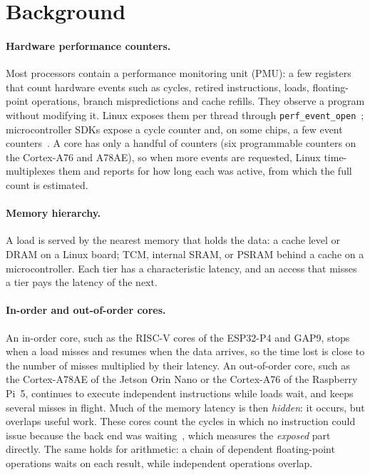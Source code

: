 \documentclass[10pt,a4paper,twocolumn]{article}
\newcommand{\code}[1]{\texttt{\small #1}}
\begin{document}
\section{Background}

\paragraph{Hardware performance counters.} Most processors contain a performance monitoring unit (PMU): a few registers that count hardware events such as cycles, retired instructions, loads, floating-point operations, branch mispredictions and cache refills. They observe a program without modifying it. Linux exposes them per thread through \code{perf\_event\_open}~\cite{perfman}; microcontroller SDKs expose a cycle counter and, on some chips, a few event counters~\cite{espidf,gapsdk}. A core has only a handful of counters (six programmable counters on the Cortex-A76 and A78AE), so when more events are requested, Linux time-multiplexes them and reports for how long each was active, from which the full count is estimated.

\paragraph{Memory hierarchy.} A load is served by the nearest memory that holds the data: a cache level or DRAM on a Linux board; TCM, internal SRAM, or PSRAM behind a cache on a microcontroller. Each tier has a characteristic latency, and an access that misses a tier pays the latency of the next.

\paragraph{In-order and out-of-order cores.} An in-order core, such as the RISC-V cores of the ESP32-P4 and GAP9, stops when a load misses and resumes when the data arrives, so the time lost is close to the number of misses multiplied by their latency. An out-of-order core, such as the Cortex-A78AE of the Jetson Orin Nano or the Cortex-A76 of the Raspberry Pi~5, continues to execute independent instructions while loads wait, and keeps several misses in flight. Much of the memory latency is then \emph{hidden}: it occurs, but overlaps useful work. These cores count the cycles in which no instruction could issue because the back end was waiting~\cite{topdown}, which measures the \emph{exposed} part directly. The same holds for arithmetic: a chain of dependent floating-point operations waits on each result, while independent operations overlap.
\end{document}

